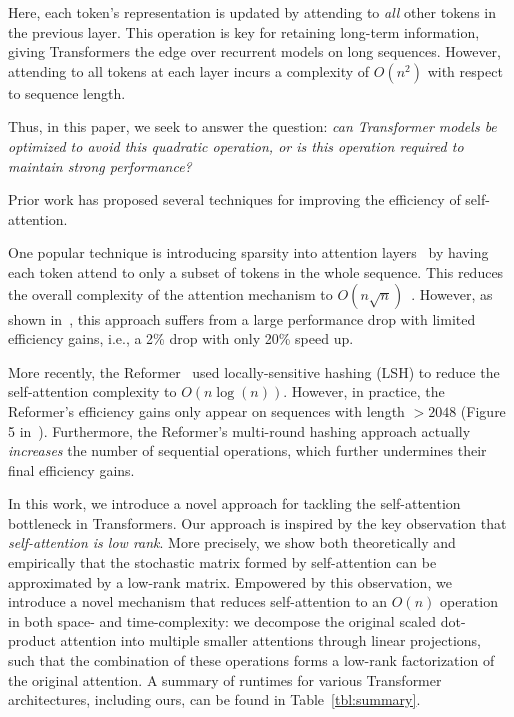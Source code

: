 Here, each token's representation is updated by attending to \textit{all} other tokens in the previous layer. This operation is key for retaining long-term information, giving Transformers the edge over recurrent models on long sequences. However, attending to all tokens at each layer incurs a complexity of $O(n^2)$ with respect to sequence length. 

Thus, in this paper, we seek to answer the question: 
\textit{can Transformer models be optimized to avoid this quadratic operation, or is this operation required to maintain strong performance?}

Prior work has proposed several techniques for improving the efficiency of self-attention.

One popular technique is introducing sparsity into attention layers~\citep{child2019generating,qiu2019blockwise,beltagy2020longformer} by having each token attend to only a subset of tokens in the whole sequence. This reduces the overall complexity of the attention mechanism to $O(n\sqrt{n})$~\citep{child2019generating}. However, as shown in~\citet{qiu2019blockwise}, this approach suffers from a large performance drop with limited efficiency gains, i.e., a 2\% drop with only 20\% speed up. 

More recently, the Reformer~\citep{kitaev2019reformer} used locally-sensitive hashing (LSH) to reduce the self-attention complexity to $O(n\log(n))$.
However, in practice, the Reformer's efficiency gains only appear on sequences with length $> 2048$ (Figure 5 in~\cite{kitaev2019reformer}). Furthermore, the Reformer's multi-round hashing approach actually \textit{increases} the number of sequential operations, which further undermines their final efficiency gains. 

In this work, we introduce a novel approach for tackling the self-attention bottleneck in Transformers. Our approach is inspired by the key observation that \emph{self-attention is low rank}. More precisely, we show both theoretically and empirically that the stochastic matrix formed by self-attention can be approximated by a low-rank matrix. Empowered by this observation, we introduce a novel mechanism that reduces self-attention to an $O(n)$ operation in both space- and time-complexity: we decompose the original scaled dot-product attention into multiple smaller attentions through linear projections, such that the combination of these operations forms a low-rank factorization of the original attention. A summary of runtimes for various Transformer architectures, including ours, can be found in Table~\ref{tbl:summary}.

